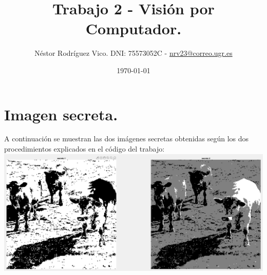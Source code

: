 \documentclass[12pt]{article}
\title{Trabajo 2 - Visión por Computador.}
\author{Néstor Rodríguez Vico. DNI: 75573052C - \href{mailto:nrv23@correo.ugr.es}{nrv23@correo.ugr.es}}
\date{\today}
\begin{document}
\maketitle

\setlength{\belowdisplayskip}{5pt} 
\setlength{\belowdisplayshortskip}{5pt}
\setlength{\abovedisplayskip}{5pt} 
\setlength{\abovedisplayshortskip}{5pt}

\section{Imagen secreta.}

A continuación se muestran las dos imágenes secretas obtenidas según los dos procedimientos explicados en el código del trabajo: \\

\includegraphics[width=\linewidth]{images/vacas.png}
\end{document}
